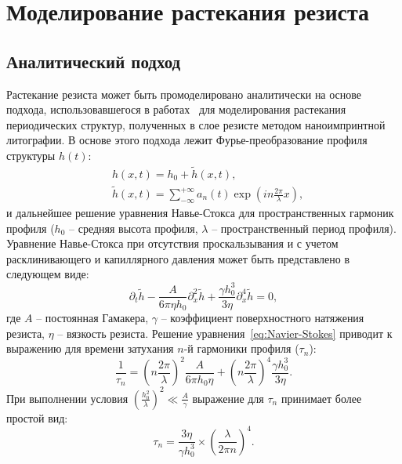 \section{Моделирование растекания резиста}


\subsection{Аналитический подход}
Растекание резиста может быть промоделировано аналитически на основе подхода, использовавшегося в работах~\cite{Leveder_2008, Leveder_2011} для моделирования растекания периодических структур, полученных в слое резисте методом наноимпринтной литографии. В основе этого подхода лежит Фурье-преобразование профиля структуры $h(t)$:
\begin{equation}
	\begin{aligned}
		& h(x, t) = h_0 + \tilde{h}(x, t), \\
		& \tilde{h}(x, t) = \sum_{-\infty}^{+\infty} a_n(t) \exp \left(i n \frac{2 \pi}{\lambda} x\right),
	\end{aligned}
\end{equation}
и дальнейшее решение уравнения Навье-Стокса для пространственных гармоник профиля ($h_0$ -- средняя высота профиля, $\lambda$ -- пространственный период профиля).
Уравнение Навье-Стокса при отсутствия проскальзывания и с учетом расклинивающего и капиллярного давления может быть представлено в следующем виде:
\begin{equation} \label{eq:Navier-Stokes}
	\partial_t \tilde{h}-\frac{A}{6 \pi \eta h_0} \partial_x^2 \tilde{h}+\frac{\gamma h_0^3}{3 \eta} \partial_x^4 \tilde{h} = 0,
\end{equation}
где $A$ -- постоянная Гамакера, $\gamma$ -- коэффициент поверхностного натяжения резиста, $\eta$ -- вязкость резиста. Решение уравнения~\ref{eq:Navier-Stokes} приводит к выражению для времени затухания $n$-й гармоники профиля ($\tau_n$):
\begin{equation}
	\frac{1}{\tau_n}=\left(n \frac{2 \pi}{\lambda}\right)^2 \frac{A}{6 \pi h_0 \eta}+\left(n \frac{2 \pi}{\lambda}\right)^4 \frac{\gamma h_0^3}{3 \eta}.
\end{equation}
При выполнении условия $\left(\frac{\displaystyle h_0^2}{\displaystyle \lambda}\right)^2 \ll \frac{\displaystyle A}{\displaystyle \gamma}$ выражение для $\tau_n$ принимает более простой вид:
\begin{equation}
	\tau_n=\frac{3 \eta}{\gamma h_0^3} \times\left(\frac{\lambda}{2 \pi n}\right)^4.
\end{equation}
